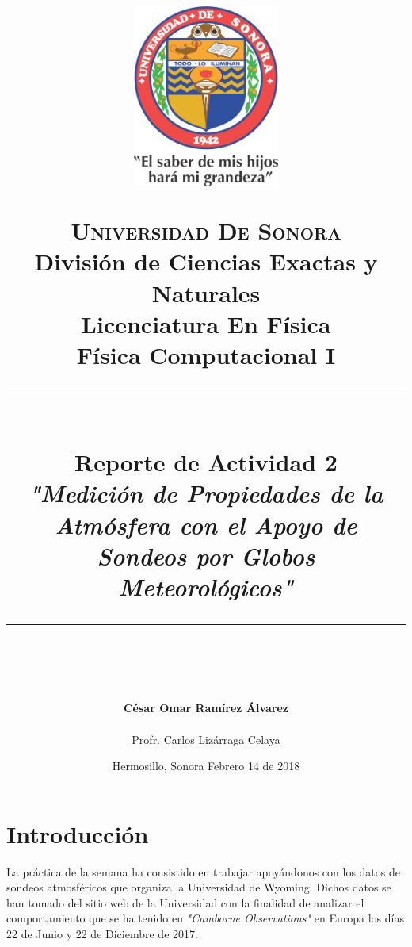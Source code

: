 \documentclass[12pt]{article}
\newcommand{\HRule}[1]{\rule{\linewidth}{#1}}
\begin{document}
\begin{titlepage}

\title{ \normalsize 
        \begin{center}
        \includegraphics[height=6cm]{Logo.jpg}
        \end{center}
        \LARGE \textsc{\textbf{Universidad De Sonora}} \\ \bigskip
		\Large División de Ciencias Exactas y Naturales \\
        Licenciatura En Física \\ \bigskip
        \bigskip
        Física Computacional I
		\\ [0.1cm]  
		\HRule{2pt} \\
		\Large \textbf{{Reporte de Actividad 2}} \\
        \textit{\textbf{"Medición de Propiedades de la Atmósfera con el Apoyo de Sondeos por Globos Meteorológicos"}}
		\HRule{2pt} \\
		\normalsize \vspace*{0.001\baselineskip}}
        
\date{\bigskip \Large Hermosillo, Sonora  \hspace*{\fill}  Febrero 14 de 2018}

        
\author{
		\Large\textbf{ César Omar Ramírez Álvarez} \\ \bigskip
        \\ \bigskip
       \Large Profr. Carlos Lizárraga Celaya}
       \end{titlepage}
       \maketitle
       

\newpage
\pagestyle{plain}

\section*{Introducción}
La práctica de la semana ha consistido en trabajar apoyándonos con los datos de sondeos atmosféricos que organiza la Universidad de Wyoming. Dichos datos se han tomado del sitio web de la Universidad con la finalidad de analizar el comportamiento que se ha tenido en \textit{"Camborne Observations"} en Europa los días 22 de Junio y 22 de Diciembre de 2017.\\
\end{document}
